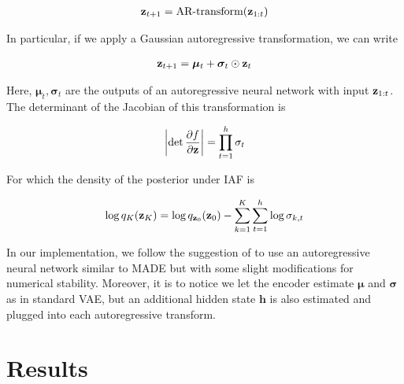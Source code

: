 \documentclass[12pt]{article}
\begin{document}
\begin{align}
    \textbf{z}_{t+1} = \text{AR-transform}(\textbf{z}_{1:t})
\end{align}

In particular, if we apply a Gaussian autoregressive transformation, we can write

\begin{align}
    \textbf{z}_{t+1} = \boldsymbol{\mu}_t + \boldsymbol{\sigma}_t \odot \textbf{z}_t
\end{align}

Here, \(\boldsymbol{\mu}_t, \boldsymbol{\sigma}_t\) are the outputs of an autoregressive neural network with input \(\textbf{z}_{1:t}\). The determinant of the Jacobian of this transformation is

\begin{equation}
    \left| \det \frac{\partial f}{\partial \textbf{z}} \right| = \prod_{t=1}^h \sigma_t
\end{equation}

For which the density of the posterior under IAF is

\begin{equation}
    \log q_K(\textbf{z}_K) = \log q_{\textbf{z}_0}(\textbf{z}_0) - \sum_{k=1}^K \sum_{t=1}^h \log \sigma_{k,t}
\end{equation}

In our implementation, we follow the suggestion of \cite{Kingma2016ImprovedVI} to use an autoregressive neural network similar to MADE \cite{pmlr-v37-germain15} but with some slight modifications for numerical stability.
Moreover, it is to notice we let the encoder estimate \(\boldsymbol{\mu}\) and \(\boldsymbol{\sigma}\) as in standard VAE, but an additional hidden state \(\mathbf{h}\) is also estimated and plugged into each autoregressive transform. 

\section{Results}




\end{document}
